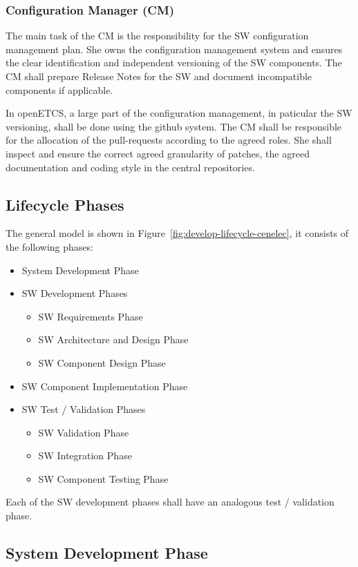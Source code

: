 \subsubsection{Configuration Manager (CM)}
\label{sec:conf-manag}

The main task of the CM is the responsibility for the SW configuration
management plan. She owns the configuration management system and ensures the
clear identification and independent versioning of the SW components. The CM
shall prepare Release Notes for the SW and document incompatible components if
applicable.

In openETCS, a large part of the configuration management, in paticular the SW
versioning, shall be done using the github system. The CM shall be responsible
for the allocation of the pull-requests according to the agreed roles. She shall
inspect and ensure the correct agreed granularity of patches, the agreed
documentation and coding style in the central repositories.

\subsection{Lifecycle Phases}
\label{sec:lifecycle-phases}

The general model is shown in Figure~\ref{fig:develop-lifecycle-cenelec}, it
consists of the following phases:

\begin{itemize}
\item System Development Phase
\item SW Development Phases
  \begin{itemize}
  \item SW Requirements Phase
  \item SW Architecture and Design Phase
  \item SW Component Design Phase
  \end{itemize}
\item SW Component Implementation Phase
\item SW Test / Validation Phases
  \begin{itemize}
  \item SW Validation Phase
  \item SW Integration Phase
  \item SW Component Testing Phase
  \end{itemize}
\end{itemize}

Each of the SW development phases shall have an analogous test / validation
phase.

\subsection{System Development Phase}
\label{sec:syst-devel-phase}



